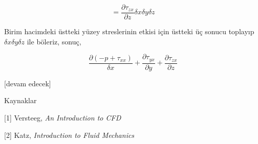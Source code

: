 \documentclass[12pt,fleqn]{article}\usepackage{../../common}
\begin{document}
$$
= \frac{\partial \tau_{zx}}{\partial z} \delta x \delta y \delta z 
$$

Birim hacimdeki üstteki yüzey streslerinin etkisi için üstteki üç sonucu
toplayıp $\delta x \delta y \delta z $ ile böleriz, sonuç,

$$
\frac{\partial (-p + \tau_{xx})}{\delta x} +
\frac{\partial \tau_{yx}}{\partial y} +
\frac{\partial \tau_{zx}}{\partial z} 
$$






[devam edecek]

Kaynaklar

[1] Versteeg, {\em An Introduction to CFD}

[2] Katz, {\em Introduction to Fluid Mechanics}
\end{document}
